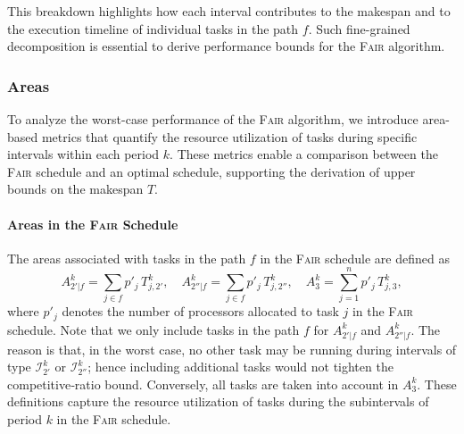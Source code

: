 \documentclass{article}
\begin{document}
This breakdown highlights how each interval contributes to the makespan and to the execution timeline of individual tasks in the path $f$. Such fine-grained decomposition is essential to derive performance bounds for the \textsc{Fair} algorithm.



\subsubsection{Areas}
To analyze the worst-case performance of the \textsc{Fair} algorithm, we introduce area-based metrics that quantify the resource utilization of tasks during specific intervals within each period \( k \). These metrics enable a comparison between the \textsc{Fair} schedule and an optimal schedule, supporting the derivation of upper bounds on the makespan \( T \).

\paragraph{Areas in the \textsc{Fair} Schedule}


The areas associated with tasks in the path \( f \) in the \textsc{Fair} schedule are defined as
\[
A_{2'|f}^{k} = \sum_{j \in f} p'_j\, T_{j,2'}^{k},\quad
A_{2''|f}^{k} = \sum_{j \in f} p'_j\, T_{j,2''}^{k},\quad
A_{3}^{k} = \sum_{j=1}^{n} p'_j\, T_{j,3}^{k},
\]
where \(p'_j\) denotes the number of processors allocated to task \(j\) in the \textsc{Fair} schedule. Note that we only include tasks in the path $f$ for $A_{2'|f}^{k}$ and $A_{2''|f}^{k}$. The reason is that, in the worst case, no other task may be running during
intervals of type \(\mathcal{I}_{2'}^{k}\) or \(\mathcal{I}_{2''}^{k}\); hence
including additional tasks would not tighten the competitive‐ratio bound.
Conversely, all tasks are taken into account in \(A_{3}^{k}\).
These definitions capture the resource utilization of tasks during the subintervals of period \( k \) in the \textsc{Fair} schedule.
\end{document}
